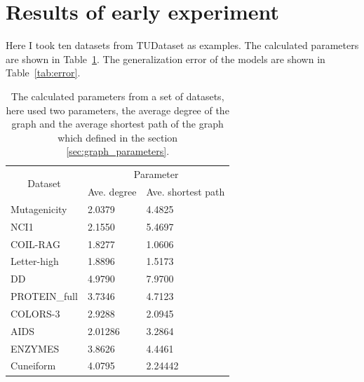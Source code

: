 \documentclass{article}
\begin{document}
\begin{description}
\end{description}


\section{Results of early experiment} \label{sec:results}

Here I took ten datasets from TUDataset as examples. The calculated parameters are shown in Table~\ref{tab:parameter}. The generalization error of the models are shown in Table~\ref{tab:error}. 


\begin{table}[h!]
    \centering
    \begin{tabular}{@{}lll@{}}
    \toprule
    \multicolumn{1}{c}{\multirow{2}{*}{Dataset}} & \multicolumn{2}{c}{Parameter}                                            \\ \cmidrule(l){2-3} 
    \multicolumn{1}{c}{}                         & \multicolumn{1}{c}{Ave. degree} & \multicolumn{1}{c}{Ave. shortest path} \\ \midrule
    Mutagenicity                                 & 2.0379         & 4.4825                     \\
    NCI1                                         & 2.1550         & 5.4697                     \\
    COIL-RAG                                     & 1.8277         & 1.0606                     \\
    Letter-high                                  & 1.8896         & 1.5173                     \\
    DD                                           & 4.9790         & 7.9700                     \\
    PROTEIN\_full                                & 3.7346         & 4.7123                     \\
    COLORS-3                                     & 2.9288         & 2.0945                     \\ 

    AIDS  &  2.01286  & 3.2864 \\
    ENZYMES  &  3.8626  & 4.4461 \\
    Cuneiform  &  4.0795  & 2.24442 \\ \bottomrule

    \end{tabular}
    \caption{The calculated parameters from a set of datasets, here used two parameters, the average degree of the graph and the average shortest path of the graph which defined in the section \ref{sec:graph_parameters}.}
    \label{tab:parameter}
\end{table}
\end{document}
